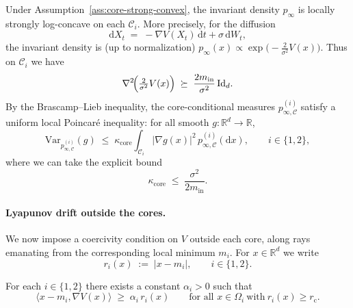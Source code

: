 Under Assumption~\ref{ass:core-strong-convex}, the invariant density
\(p_\infty\) is locally strongly log-concave on each \(\mathcal C_i\).
More precisely, for the diffusion
\[
\mathrm dX_t \;=\; -\nabla V(X_t)\,\mathrm dt + \sigma\,\mathrm dW_t,
\]
the invariant density is (up to normalization) \(p_\infty(x)\propto
\exp\bigl(-\tfrac{2}{\sigma^2}V(x)\bigr)\).
Thus on \(\mathcal C_i\) we have
\[
\nabla^2\!\Bigl(\tfrac{2}{\sigma^2}V(x)\Bigr)
\;\succeq\;
\frac{2m_{\mathrm{in}}}{\sigma^2}\,\mathrm{Id}_d.
\]
By the Brascamp--Lieb inequality, the core-conditional measures \(p_{\infty,\mathcal C}^{(i)}\)
satisfy a uniform local Poincar\'e inequality: for all smooth
\(g:\mathbb R^d\to\mathbb R\),
\begin{equation}\label{eq:core-Poincare}
\mathrm{Var}_{p_{\infty,\mathcal C}^{(i)}}(g)
\;\le\;
\kappa_{\mathrm{core}}
\int_{\mathcal C_i} |\nabla g(x)|^2\,p_{\infty,\mathcal C}^{(i)}(\mathrm dx),
\qquad
i\in\{1,2\},
\end{equation}
where we can take the explicit bound
\begin{equation}\label{eq:kappa-core-explicit}
\kappa_{\mathrm{core}}
\;\le\;
\frac{\sigma^2}{2m_{\mathrm{in}}}.
\end{equation}

\paragraph{Lyapunov drift outside the cores.}
We now impose a coercivity condition on \(V\) outside each core, along rays
emanating from the corresponding local minimum \(m_i\).
For \(x\in\mathbb R^d\) we write
\[
r_i(x) \;:=\; |x-m_i|,
\qquad i\in\{1,2\}.
\]

\begin{assumption}\label{ass:drift-outside-core}
For each \(i\in\{1,2\}\) there exists a constant \(\alpha_i>0\) such that
\begin{equation}\label{eq:drift-condition-core}
\bigl\langle x-m_i,\nabla V(x)\bigr\rangle
\;\ge\;
\alpha_i\,r_i(x)
\qquad
\text{for all }x\in\Omega_i\ \text{with}\ r_i(x)\ge r_{\mathrm c}.
\end{equation}
\end{assumption}

